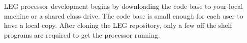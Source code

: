 LEG processor development begins by downloading the code base to your local machine or a shared class drive.
The code base is small enough for each user to have a local copy.
After cloning the LEG repository, only a few off the shelf programs are required to get the processor running.